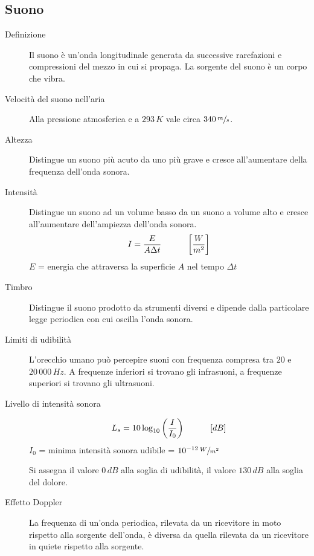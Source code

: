 \documentclass[a4paper,11pt,italian]{article}
\begin{document}
\subsection{Suono}

\begin{description}
  \item[Definizione] 
  Il suono è un'onda longitudinale generata da successive rarefazioni e compressioni del mezzo in cui si propaga.
  La sorgente del suono è un corpo che vibra.

  \item[Velocità del suono nell'aria] 
  Alla pressione atmosferica e a $ 293 \, K $ vale circa $ 340 \, \sfrac{m}{s} $.

  \item[Altezza] 
  Distingue un suono più acuto da uno più grave e cresce all'aumentare della frequenza dell'onda sonora.

  \item[Intensità]
  Distingue un suono ad un volume basso da un suono a volume alto e cresce all'aumentare dell'ampiezza dell'onda sonora.
  \[ I = \frac{E}{A \Delta t} \hspace*{3em} \left[ \frac{W}{m^2} \right]\]
  $ E $ = energia che attraversa la superficie $ A $ nel tempo $ \Delta t $

  \item[Timbro] 
  Distingue il suono prodotto da strumenti diversi e dipende dalla particolare legge periodica con cui oscilla l'onda sonora.

  \item[Limiti di udibilità] 
  L'orecchio umano può percepire suoni con frequenza compresa tra $ 20 $ e $ 20\, 000 \, Hz $. A frequenze inferiori si trovano gli infrasuoni, a frequenze superiori si trovano gli ultrasuoni.

  \item[Livello di intensità sonora]
  \[ L_s = 10 \log_{10} \left(\frac{I}{I_0}\right) \hspace*{3em} [dB] \]
  $ I_0 $ = minima intensità sonora udibile = $ 10^{-12} \, \sfrac{W}{m^2} $
  
  Si assegna il valore $ 0 \, dB $ alla soglia di udibilità, il valore $ 130 \, dB $ alla soglia del dolore.

  \item[Effetto Doppler] 
  La frequenza di un'onda periodica, rilevata da un ricevitore in moto rispetto alla sorgente dell'onda, è diversa da quella rilevata da un ricevitore in quiete rispetto alla sorgente.
  

\end{description}
\end{document}

